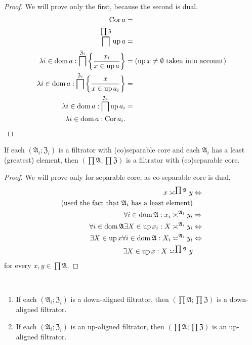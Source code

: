 \begin{proof}
We will prove only the first, because the second is dual.
\begin{align*}
\operatorname{Cor} a & =\\
\bigsqcap^{\prod\mathfrak{Z}}\operatorname{up} a & =\\
\lambda i\in\operatorname{dom} a:\bigsqcap^{\mathfrak{Z}_{i}}\left\{ \frac{x_{i}}{x\in\operatorname{up} a}\right\} & =\text{(\ensuremath{\operatorname{up} x\ne\emptyset} taken into account)}\\
\lambda i\in\operatorname{dom} a:\bigsqcap^{\mathfrak{Z}_{i}}\left\{ \frac{x}{x\in\operatorname{up} a_{i}}\right\} & =\\
\lambda i\in\operatorname{dom} a:\bigsqcap^{\mathfrak{Z}_{i}}\operatorname{up} a_{i} & =\\
\lambda i\in\operatorname{dom} a:\operatorname{Cor} a_{i}.
\end{align*}
\end{proof}
\begin{prop}
If each $(\mathfrak{A}_{i};\mathfrak{Z}_{i})$ is a filtrator with
(co)separable core and each $\mathfrak{A}_{i}$ has a least (greatest)
element, then $\left(\prod\mathfrak{A};\prod\mathfrak{Z}\right)$
is a filtrator with (co)separable core.\end{prop}
\begin{proof}
We will prove only for separable core, as co-separable core is dual.
\begin{align*}
x\asymp^{\prod\mathfrak{A}}y & \Leftrightarrow\\
\text{(used the fact that \ensuremath{\mathfrak{A}_{i}} has a least element)}\\
\forall i\in\operatorname{dom}\mathfrak{A}:x_{i}\asymp^{\mathfrak{A}_{i}}y_{i} & \Rightarrow\\
\forall i\in\operatorname{dom}\mathfrak{A}\exists X\in\operatorname{up} x_{i}:X\asymp^{\mathfrak{A}_{i}}y_{i} & \Leftrightarrow\\
\exists X\in\operatorname{up} x\forall i\in\operatorname{dom}\mathfrak{A}:X_{i}\asymp^{\mathfrak{A}_{i}}y_{i} & \Leftrightarrow\\
\exists X\in\operatorname{up} x:X\asymp^{\prod\mathfrak{A}}y
\end{align*}
for every $x,y\in\prod\mathfrak{A}$.\end{proof}
\begin{obvious}
~
\begin{enumerate}
\item If each $(\mathfrak{A}_{i};\mathfrak{Z}_{i})$ is a down-aligned filtrator,
then $\left(\prod\mathfrak{A};\prod\mathfrak{Z}\right)$ is a down-aligned
filtrator.
\item If each $(\mathfrak{A}_{i};\mathfrak{Z}_{i})$ is an up-aligned filtrator,
then $\left(\prod\mathfrak{A};\prod\mathfrak{Z}\right)$ is an up-aligned
filtrator.
\end{enumerate}
\end{obvious}
